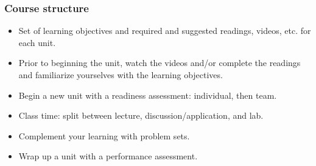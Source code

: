 \documentclass[11pt]{beamer}
\begin{document}

\begin{frame}
\frametitle{Course structure}

\begin{itemize}[<alert@+>]
\item Set of learning objectives and required and suggested readings, videos, etc. for \pause
each unit.
\item Prior to beginning the unit, watch the videos and/or complete the readings and 
familiarize yourselves with the learning objectives. \pause
\item Begin a new unit with a readiness assessment: individual, then team. \pause
\item Class time: split between lecture, discussion/application, and lab. \pause
\item Complement your learning with problem sets. \pause
\item Wrap up a unit with a performance assessment. \pause
\end{itemize}

\end{frame}
\end{document}
